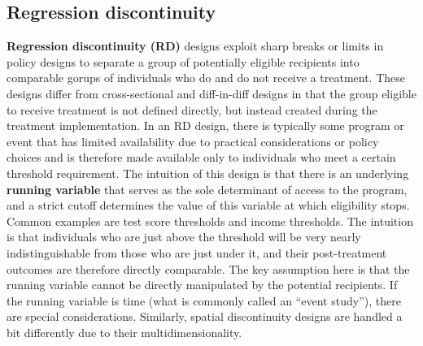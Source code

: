 \subsection{Regression discontinuity}

\textbf{Regression discontinuity (RD)} designs exploit sharp breaks or limits
in policy designs to separate a group of potentially eligible recipients
into comparable gorups of individuals who do and do not receive a treatment.
These designs differ from cross-sectional and diff-in-diff designs
in that the group eligible to receive treatment is not defined directly,
but instead created during the treatment implementation.
In an RD design, there is typically some program or event
that has limited availability due to practical considerations or policy choices
and is therefore made available only to individuals who meet a certain threshold requirement.
The intuition of this design is that there is an underlying \textbf{running variable}
that serves as the sole determinant of access to the program,
and a strict cutoff determines the value of this variable at which eligibility stops.\cite{imbens2008regression}
Common examples are test score thresholds and income thresholds.
The intuition is that individuals who are just above the threshold
will be very nearly indistinguishable from those who are just under it,
and their post-treatment outcomes are therefore directly comparable.\cite{lee2010regression}
The key assumption here is that the running variable cannot be directly manipulated
by the potential recipients.
If the running variable is time (what is commonly called an ``event study''),
there are special considerations.\cite{hausman2018regression}
Similarly, spatial discontinuity designs are handled a bit differently due to their multidimensionality.

